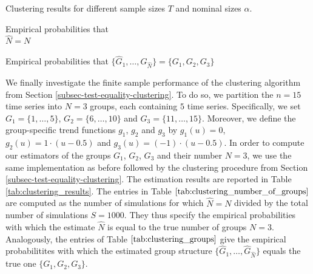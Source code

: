 \begin{table}[t]
\footnotesize{
\begin{center}
\caption{Clustering results for different sample sizes $T$ and nominal sizes $\alpha$.}\label{tab:clustering_results}
\begin{subtable}[b]{0.48\textwidth}
\centering
\caption{Empirical probabilities that \\ $\widehat{N} = N$}\label{tab:clustering_number_of_groups}
\renewcommand{\arraystretch}{1.2}

\end{subtable}
\begin{subtable}[b]{0.48\textwidth}
\centering
\caption{\centering Empirical probabilities that $\{ \widehat{G}_1,\ldots,\widehat{G}_{\widehat{N}}\} = \{ G_1,G_2,G_3\}$}\label{tab:clustering_groups}
\renewcommand{\arraystretch}{1.2}

\end{subtable}
\end{center}}
\end{table}


We finally investigate the finite sample performance of the clustering algorithm from Section \ref{subsec-test-equality-clustering}. To do so, we partition the $n = 15$ time series into $N=3$ groups, each containing $5$ time series. Specifically, we set $G_1 = \{1,\ldots,5\}$, $G_2 = \{6,\ldots,10\}$ and $G_3 =  \{11,\ldots,15\}$. Moreover, we define the group-specific trend functions $g_1$, $g_2$ and $g_3$ by $g_1(u) = 0$, $g_2(u) = 1 \cdot (u - 0.5)$ and $g_3(u) =  (- 1) \cdot (u - 0.5)$. In order to compute our estimators of the groups $G_1$, $G_2$, $G_3$ and their number $N = 3$, we use the same implementation as before followed by the clustering procedure from Section \ref{subsec-test-equality-clustering}. The estimation results are reported in Table \ref{tab:clustering_results}. The entries in Table $\ref{tab:clustering_number_of_groups}$ are computed as the number of simulations for which $\widehat{N} = N$ divided by the total number of simulations $S = 1000$. They thus specify the empirical probabilities with which the estimate $\widehat{N}$ is equal to the true number of groups $N = 3$. Analogously, the entries of Table $\ref{tab:clustering_groups}$ give the empirical probabilitites with which the estimated group structure $\{ \widehat{G}_1,\ldots,\widehat{G}_{\widehat{N}}\}$ equals the true one $\{G_1,G_2,G_3\}$. 


